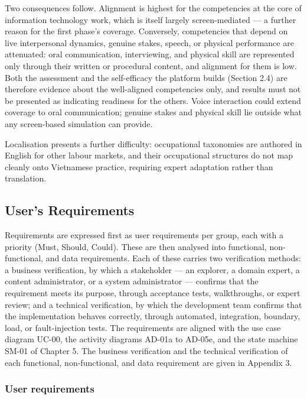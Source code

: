 Two consequences follow. Alignment is highest for the competencies at the core of information technology work, which is itself largely screen-\allowbreak{}mediated --- a further reason for the first phase's coverage. Conversely, competencies that depend on live interpersonal dynamics, genuine stakes, speech, or physical performance are attenuated: oral communication, interviewing, and physical skill are represented only through their written or procedural content, and alignment for them is low. Both the assessment and the self-\allowbreak{}efficacy the platform builds (Section 2.4) are therefore evidence about the well-\allowbreak{}aligned competencies only, and results must not be presented as indicating readiness for the others. Voice interaction could extend coverage to oral communication; genuine stakes and physical skill lie outside what any screen-\allowbreak{}based simulation can provide.

Localisation presents a further difficulty: occupational taxonomies are authored in English for other labour markets, and their occupational structures do not map cleanly onto Vietnamese practice, requiring expert adaptation rather than translation.

\subsection{User's Requirements}

Requirements are expressed first as user requirements per group, each with a priority (Must, Should, Could). These are then analysed into functional, non-\allowbreak{}functional, and data requirements. Each of these carries two verification methods: a business verification, by which a stakeholder --- an explorer, a domain expert, a content administrator, or a system administrator --- confirms that the requirement meets its purpose, through acceptance tests, walkthroughs, or expert review; and a technical verification, by which the development team confirms that the implementation behaves correctly, through automated, integration, boundary, load, or fault-\allowbreak{}injection tests. The requirements are aligned with the use case diagram UC-00, the activity diagrams AD-01a to AD-05e, and the state machine SM-01 of Chapter 5. The business verification and the technical verification of each functional, non-\allowbreak{}functional, and data requirement are given in Appendix 3.

\subsubsection{User requirements}

